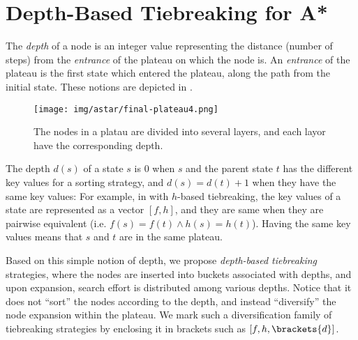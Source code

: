 \section{Depth-Based Tiebreaking for A*}

\label{sec:depth}

The \emph{depth} of a node is an integer value representing the distance
(number of steps) from the \emph{entrance} of the plateau on which the node is.
An \emph{entrance} of the plateau is the first state which entered the
plateau, along the path from the initial state. These notions are depicted
in .

\begin{figure}[htbp]
 \texttt{[image: img/astar/final-plateau4.png]}
 \caption{The nodes in a platau are divided into several layers,
 and each layor have the corresponding depth.}
 \label{fig:plateau-depiction}
\end{figure}

The depth $d(s)$ of a
state $s$ is 0 when $s$ and the parent state $t$ has the different key
values for a sorting strategy, and $d(s)=d(t)+1$ when they have the same
key values: For example, in \astar with $h$-based tiebreaking, the key
values of a state are represented as a vector $[f,h]$, and they are same
when they are pairwise equivalent (i.e. $f(s) = f(t) \land h(s) =
h(t)$).  Having the same key values means that $s$ and $t$ are in the
same plateau. 



Based on this simple notion of depth, we propose \emph{depth-based
tiebreaking} strategies, where the nodes are inserted into buckets
associated with depths, and upon expansion, search effort is distributed
among various depths. Notice that it does not ``sort'' the nodes
according to the depth, and instead ``diversify'' the node expansion
within the plateau. We mark such a diversification family of
tiebreaking strategies by enclosing it in brackets such as $[f,h,\brackets{d}]$.

